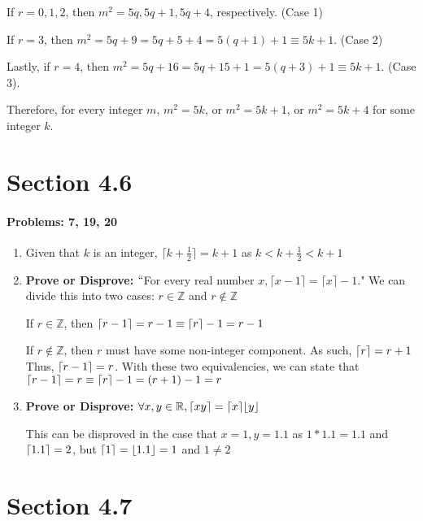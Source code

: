 \documentclass{article}
\makeatletter
\DeclarePairedDelimiter{\ceil}{\lceil}{\rceil}
\DeclarePairedDelimiter{\floor}{\lfloor}{\rfloor}
\newcommand\setItemnumber[1]{\setcounter{enum\romannumeral\@enumdepth}{\numexpr#1-1\relax}}
\makeatother
\begin{document}
\begin{enumerate}
     If $r=0,1,2$, then $m^2 = 5q, 5q+1, 5q+4$, respectively. (Case 1)

     If $r=3$, then $m^2=5q+9 = 5q+5+4=5(q+1)+1 \equiv 5k+1$. (Case 2)

     Lastly, if $r=4$, then $m^2=5q+16 = 5q+15+1 = 5(q+3)+1 \equiv 5k+1$. (Case 3).

     Therefore, for every integer $m$, $m^2=5k$, or $m^2=5k+1$, or $m^2=5k+4$ for some integer $k$.
     
 \end{enumerate}
  
\section{Section 4.6}
\paragraph{Problems: 7, 19, 20}

\begin{enumerate}
    \setItemnumber{7}
    \item Given that $k$ is an integer, $\lceil{k+\frac{1}{2}}\rceil = k+1$ as $k<k+\frac{1}{2}<k+1$
    \setItemnumber{19}
    \item \textbf{Prove or Disprove: } $``$For every real number $x, \lceil x-1\rceil=\lceil x\rceil-1.$"
    We can divide this into two cases: $r\in\mathbb{Z}$ and $r\not\in\mathbb{Z}$
    
    If $r\in\mathbb{Z}$, then $\ceil{r-1} = r-1 \equiv \ceil{r}-1 = r-1 $
    
    If $r\not\in\mathbb{Z}$, then $r$ must have some non-integer component. As such, $\ceil{r} = r+1$ Thus, $\ceil{r-1} = r$. With these two equivalencies, we can state that $\ceil{r-1} = r \equiv \ceil{r} - 1  = (r+1) -1 = r$

    \setItemnumber{20}
    \item \textbf{Prove or Disprove: } $\forall x,y \in\mathbb{R}, \ceil{xy} = \ceil{x}\floor{y}$
    
    This can be disproved in the case that $x=1, y=1.1$ as $1*1.1 = 1.1$ and $\ceil{1.1} = 2$, but $\ceil{1}=\floor{1.1}=1$ and $1\neq2$
\end{enumerate}

\section{Section 4.7}
\end{document}
